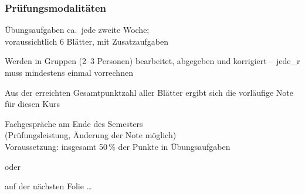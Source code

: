     \begin{frame}
      \frametitle{Prüfungsmodalitäten}
      
          \begin{Itemize}
            \item
              Übungsaufgaben ca.\ jede zweite Woche; \\
              voraussichtlich 6 Blätter, mit Zusatzaufgaben
            \item
              Werden in Gruppen (2–3 Personen) bearbeitet, abgegeben und korrigiert – jede\_r muss mindestens einmal vorrechnen
            \item
              Aus der erreichten Gesamtpunktzahl aller Blätter ergibt sich die vorläufige Note für diesen Kurs
            \item
              Fachgespräche am Ende des Semesters\\
              (Prüfungsleistung, Änderung der Note möglich)\\
              Voraussetzung:  insgesamt 50\,\% der Punkte in Übungsaufgaben             
          \end{Itemize}

          \par\smallskip
          oder
          \par\smallskip
          
          \par\bigskip
          auf der nächsten Folie \dots
    
\end{frame}
